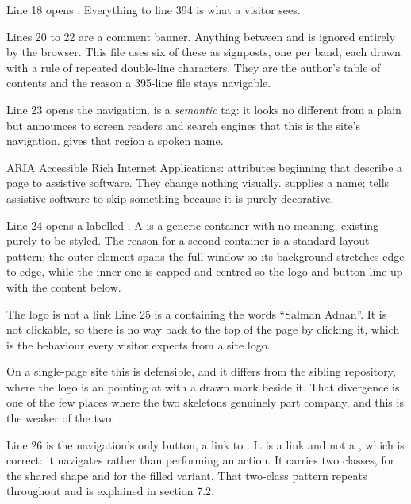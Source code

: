 Line 18 opens . Everything to line 394 is what a visitor sees.

Lines 20 to 22 are a comment banner. Anything between \code{<!-{}-} and \code{-{}->} is
ignored entirely by the browser. This file uses six of these as signposts, one per
band, each drawn with a rule of repeated double-line characters. They are the
author's table of contents and the reason a 395-line file stays navigable.

Line 23 opens the navigation.  is a \emph{semantic} tag: it looks no
different from a plain  but announces to screen readers and search
engines that this is the site's navigation.  gives that region a
spoken name.

\begin{jargon}{ARIA}
Accessible Rich Internet Applications: attributes beginning  that
describe a page to assistive software. They change nothing visually.
 supplies a name;  tells assistive
software to skip something because it is purely decorative.
\end{jargon}

Line 24 opens a  labelled . A  is a generic
container with no meaning, existing purely to be styled. The reason for a second
container is a standard layout pattern: the outer element spans the full window so
its background stretches edge to edge, while the inner one is capped and centred so
the logo and button line up with the content below.

\begin{honest}{The logo is not a link}
Line 25 is a  containing the words ``Salman Adnan''. It is not
clickable, so there is no way back to the top of the page by clicking it, which is
the behaviour every visitor expects from a site logo.

On a single-page site this is defensible, and it differs from the sibling
repository, where the logo is an  pointing at \code{/} with a drawn mark
beside it. That divergence is one of the few places where the two skeletons
genuinely part company, and this is the weaker of the two.
\end{honest}

Line 26 is the navigation's only button, a link to . It is a link and
not a , which is correct: it navigates rather than performing an
action. It carries two classes,  for the shared shape and
 for the filled variant. That two-class pattern repeats
throughout and is explained in section 7.2.

